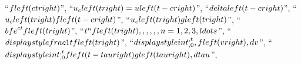 \documentclass[
  letterpaper,
  DIV=11,
  numbers=noendperiod]{scrartcl}
\begin{document}
``\(f\\left( {ct} \\right)\)'',
``\({u_c}\\left( t \\right) = u\\left( {t - c} \\right)\)'',
``\(\\delta \\left( {t - c} \\right)\)'',
``\({u_c}\\left( t \\right)f\\left( {t - c} \\right)\)'',
``\({u_c}\\left( t \\right)g\\left( t \\right)\)'',
``\({{\\bf{e}}^{ct}}f\\left( t \\right)\)'',
``\({t^n}f\\left( t \\right),\\,\\,\\,\\,\\,n = 1,2,3, \\ldots\)'',
``\(\\displaystyle \\frac{1}{t}f\\left( t \\right)\)'',
``\(\\displaystyle \\int_{{\\,0}}^{{\\,t}}{{\\,f\\left( v \\right)\\,dv}}\)'',
``\(\\displaystyle \\int_{{\\,0}}^{{\\,t}}{{f\\left( {t - \\tau } \\right)g\\left( \\tau  \\right)\\,d\\tau }}\)'',
\end{document}
